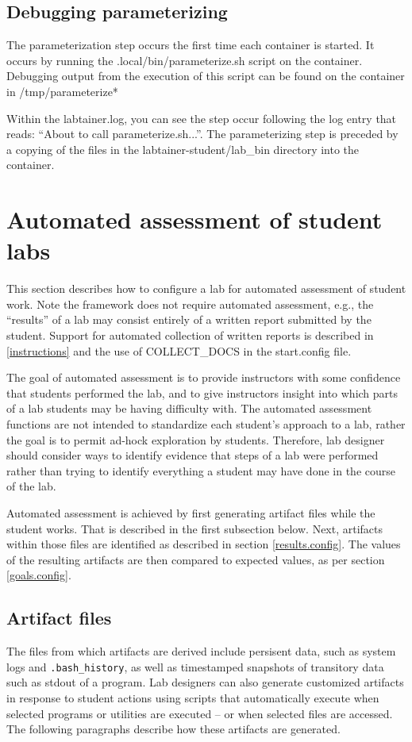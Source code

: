 \documentclass[12pt]{article}
\begin{document}
\subsection{Debugging parameterizing}
The parameterization step occurs the first time each container is started.  
It occurs by running the .local/bin/parameterize.sh script on the container.  Debugging output from the execution
of this script can be found on the container in /tmp/parameterize*

Within the labtainer.log, you can see  the step occur following the log entry that reads: ``About to call parameterize.sh...''.
The parameterizing  step is  preceded by a copying of the files in the labtainer-student/lab\_bin directory into the container.

\section{Automated assessment of student labs}
\label{assessment}
This section describes how to configure a lab for automated assessment of student work.
Note the framework does not require automated assessment, e.g., the
``results'' of a lab may consist entirely of a written report submitted by the student.
Support for automated collection of written reports is described in \ref{instructions}
and the use of COLLECT\_DOCS in the start.config file.

The goal of automated assessment is to provide instructors with some confidence that 
students performed the lab, and to give instructors insight into which parts
of a lab students may be having difficulty with.  The automated assessment functions are
not intended to standardize each student's approach to a lab, rather the goal is to permit
ad-hock exploration by students.  Therefore, lab designer should consider ways to identify
evidence that steps of a lab were performed rather than trying to identify everything a student
may have done in the course of the lab.

Automated assessment is achieved by first generating artifact files while the student works.  That
is described in the first subsection below.  Next, artifacts within those files are identified
as described in section \ref{results.config}.  The values of the resulting artifacts are then
compared to expected values, as per section \ref{goals.config}.

\subsection{Artifact files}
\label{artifact files}
The files from which artifacts are derived include persisent data, such as system logs and 
{\tt .bash\_history}, as well as 
timestamped snapshots of transitory data such as stdout of a program.  Lab designers can also generate
customized artifacts in response to student actions using scripts that automatically execute when selected
programs or utilities are executed -- or when selected files are accessed.   The following paragraphs
describe how these artifacts are generated.
\end{document}

